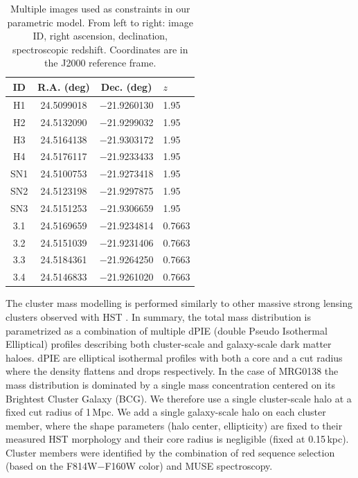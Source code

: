 \documentclass[12pt]{article}
\begin{document}
{\begin{table}[ht]
    \centering
    \begin{tabular}{cccl}
     ID &   R.A. (deg) & Dec. (deg) & $z$ \\
     \midrule
H1 & 24.5099018 & $-$21.9260130 & 1.95 \\
H2 & 24.5132090 & $-$21.9299032 & 1.95 \\
H3 & 24.5164138 & $-$21.9303172 & 1.95 \\
H4 & 24.5176117 & $-$21.9233433 & 1.95 \\
     \midrule
SN1 & 24.5100753 & $-$21.9273418 & 1.95 \\
SN2 & 24.5123198 & $-$21.9297875 & 1.95 \\
SN3 & 24.5151253 & $-$21.9306659 & 1.95 \\
     \midrule
3.1 & 24.5169659 & $-$21.9234814 & 0.7663 \\
3.2 & 24.5151039 & $-$21.9231406 & 0.7663 \\
3.3 & 24.5184361 & $-$21.9264250 & 0.7663 \\
3.4 & 24.5146833 & $-$21.9261020 & 0.7663 \\
    \end{tabular}
    \caption{Multiple images used as constraints in our parametric model. From left to right: image ID, right ascension, declination, spectroscopic redshift.  Coordinates are in the J2000 reference frame.}
    \label{tab:mulimages}
\end{table}

The cluster mass modelling is performed similarly to other massive strong lensing clusters observed with HST \cite{richard_mass_2014}. In summary, the total mass distribution is parametrized as a combination of multiple dPIE (double Pseudo Isothermal Elliptical) profiles describing both cluster-scale and galaxy-scale dark matter haloes. dPIE are elliptical isothermal profiles with both a core and a cut radius where the density flattens and drops respectively. In the case of MRG0138 the mass distribution is dominated by a single mass concentration centered on its Brightest Cluster Galaxy (BCG). We therefore use a single cluster-scale halo at a fixed cut radius of 1\,Mpc.  We add a single galaxy-scale halo on each cluster member, where the shape parameters (halo center, ellipticity) are fixed to their measured HST morphology and their core radius is negligible (fixed at 0.15\,kpc). Cluster members were identified by the combination of red sequence selection (based on the F814W$-$F160W color) and MUSE spectroscopy.

}
\end{document}
